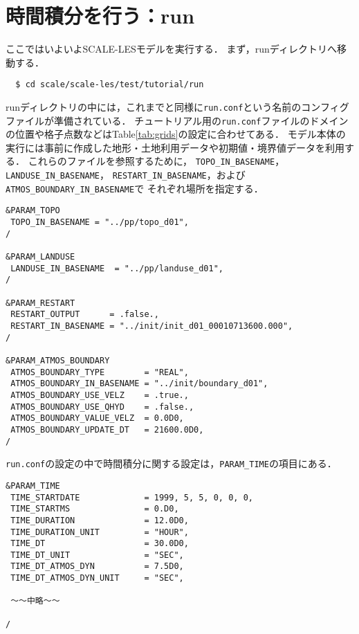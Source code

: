 
\section{時間積分を行う：run}

ここではいよいよSCALE-LESモデルを実行する．
まず，runディレクトリへ移動する．
\begin{verbatim}
  $ cd scale/scale-les/test/tutorial/run
\end{verbatim}


runディレクトリの中には，これまでと同様に\verb|run.conf|という名前のコンフィグファイルが準備されている．
チュートリアル用の\verb|run.conf|ファイルのドメインの位置や格子点数などはTable\ref{tab:grids}の設定に合わせてある．
モデル本体の実行には事前に作成した地形・土地利用データや初期値・境界値データを利用する．
これらのファイルを参照するために，
\verb|TOPO_IN_BASENAME|，\verb|LANDUSE_IN_BASENAME|，
\verb|RESTART_IN_BASENAME|，および\verb|ATMOS_BOUNDARY_IN_BASENAME|で
それぞれ場所を指定する．

\begin{verbatim}
&PARAM_TOPO
 TOPO_IN_BASENAME = "../pp/topo_d01",
/

&PARAM_LANDUSE
 LANDUSE_IN_BASENAME  = "../pp/landuse_d01",
/

&PARAM_RESTART
 RESTART_OUTPUT      = .false.,
 RESTART_IN_BASENAME = "../init/init_d01_00010713600.000",
/

&PARAM_ATMOS_BOUNDARY
 ATMOS_BOUNDARY_TYPE        = "REAL",
 ATMOS_BOUNDARY_IN_BASENAME = "../init/boundary_d01",
 ATMOS_BOUNDARY_USE_VELZ    = .true.,
 ATMOS_BOUNDARY_USE_QHYD    = .false.,
 ATMOS_BOUNDARY_VALUE_VELZ  = 0.0D0,
 ATMOS_BOUNDARY_UPDATE_DT   = 21600.0D0,
/

\end{verbatim}


\verb|run.conf|の設定の中で時間積分に関する設定は，\verb|PARAM_TIME|の項目にある．
\begin{verbatim}
&PARAM_TIME
 TIME_STARTDATE             = 1999, 5, 5, 0, 0, 0,
 TIME_STARTMS               = 0.D0,
 TIME_DURATION              = 12.0D0,
 TIME_DURATION_UNIT         = "HOUR",
 TIME_DT                    = 30.0D0,
 TIME_DT_UNIT               = "SEC",
 TIME_DT_ATMOS_DYN          = 7.5D0,
 TIME_DT_ATMOS_DYN_UNIT     = "SEC",

 ～～中略～～

/
\end{verbatim}

